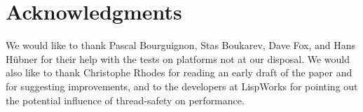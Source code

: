 \section{Acknowledgments} 

We would like to thank Pascal Bourguignon, Stas Boukarev, Dave Fox,
and Hans Hübner for their help with the tests on platforms not at our
disposal.  We would also like to thank Christophe Rhodes for reading
an early draft of the paper and for suggesting improvements, and to
the developers at LispWorks for pointing out the potential influence
of thread-safety on performance.
